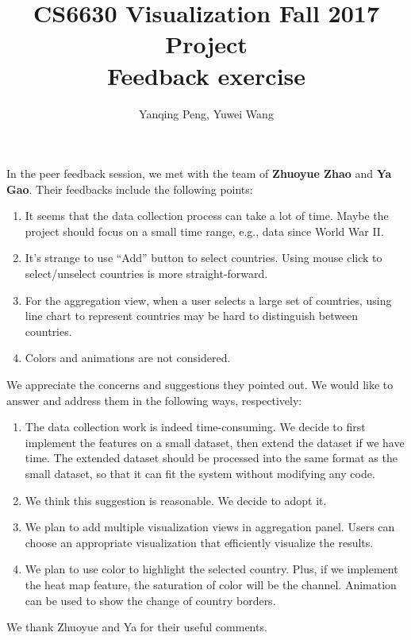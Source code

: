 \documentclass[12pt, fullpage,letterpaper]{article}
\title{CS6630 Visualization Fall 2017 Project \\ Feedback exercise}
\author{Yanqing Peng, Yuwei Wang}
\begin{document}
\maketitle

In the peer feedback session, we met with the team of \textbf{Zhuoyue Zhao} and \textbf{Ya Gao}.
Their feedbacks include the following points:

\begin{enumerate}
    \item It seems that the data collection process can take a lot of time. Maybe the project should
        focus on a small time range, e.g., data since World War II.
    \item It's strange to use ``Add'' button to select countries. Using mouse click to select/unselect
        countries is more straight-forward.
    \item For the aggregation view, when a user selects a large set of countries, using line chart
        to represent countries may be hard to distinguish between countries.
    \item Colors and animations are not considered.
\end{enumerate}

We appreciate the concerns and suggestions they pointed out. We would like to answer and address
them in the following ways, respectively:
\begin{enumerate}
    \item The data collection work is indeed time-consuming. We decide to first implement the features
        on a small dataset, then extend the dataset if we have time. The extended dataset should be processed
        into the same format as the small dataset, so that it can fit the system without modifying any code.
    \item We think this suggestion is reasonable. We decide to adopt it.
    \item We plan to add multiple visualization views in aggregation panel. Users can choose
        an appropriate visualization that efficiently visualize the results.
    \item We plan to use color to highlight the selected country. Plus, if we implement the heat map
        feature, the saturation of color will be the channel. Animation can be used to show the change
        of country borders.
\end{enumerate}

We thank Zhuoyue and Ya for their useful comments.
\end{document}
